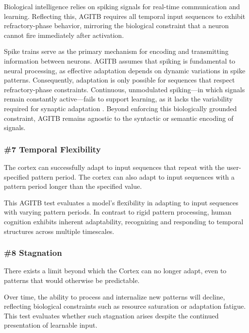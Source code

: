 \documentclass{article}
\newenvironment{one_assertion}[1]
{
  \begin{tabular}{p{1.5cm}p{8.2cm}}
    \textbf{Assertion:} & #1 \\
}{
  \end{tabular}\\
}
\newenvironment{two_assertions}[2]
{
  \begin{tabular}{p{1.5cm}p{8.2cm}}
    \textbf{Assertion:} & #1 \\
    \textbf{Assertion:} & #2 \\
}{
  \end{tabular}\\
}
\begin{document}
Biological intelligence relies on spiking signals for real-time communication and learning. Reflecting this, AGITB requires all temporal input sequences to exhibit refractory-phase behavior, mirroring the biological constraint that a neuron cannot fire immediately after activation.

Spike trains serve as the primary mechanism for encoding and transmitting information between neurons. AGITB assumes that spiking is fundamental to neural processing, as effective adaptation depends on dynamic variations in spike patterns. Consequently, adaptation is only possible for sequences that respect refractory-phase constraints. Continuous, unmodulated spiking—in which signals remain constantly active—fails to support learning, as it lacks the variability required for synaptic adaptation \cite{Gerstner2002}. Beyond enforcing this biologically grounded constraint, AGITB remains agnostic to the syntactic or semantic encoding of signals.

\subsubsection*{\#7 Temporal Flexibility}
\begin{two_assertions}
    {The cortex can successfully adapt to input sequences that repeat with the user-specified pattern period.}
    {The cortex can also adapt to input sequences with a pattern period longer than the specified value.}
\end{two_assertions}

This AGITB test evaluates a model’s flexibility in adapting to input sequences with varying pattern periods. In contrast to rigid pattern processing, human cognition exhibits inherent adaptability, recognizing and responding to temporal structures across multiple timescales.

\subsubsection*{\#8 Stagnation}
\begin{one_assertion}
    {There exists a limit beyond which the Cortex can no longer adapt, even to patterns that would otherwise be predictable.}
\end{one_assertion}

Over time, the ability to process and internalize new patterns will decline, reflecting biological constraints such as resource saturation or adaptation fatigue. This test evaluates whether such stagnation arises despite the continued presentation of learnable input.
\end{document}
